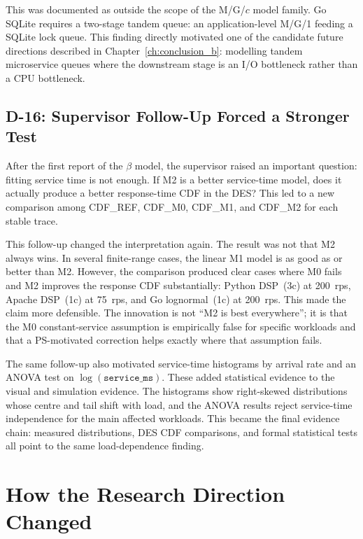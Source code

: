 This was documented as outside the scope of the M/G/$c$ model family. Go SQLite requires a two-stage tandem queue: an application-level M/G/1 feeding a SQLite lock queue. This finding directly motivated one of the candidate future directions described in Chapter~\ref{ch:conclusion_b}: modelling tandem microservice queues where the downstream stage is an I/O bottleneck rather than a CPU bottleneck.

\subsection{D-16: Supervisor Follow-Up Forced a Stronger Test}

After the first report of the $\beta$ model, the supervisor raised an important question: fitting service time is not enough. If M2 is a better service-time model, does it actually produce a better response-time CDF in the DES? This led to a new comparison among CDF\_REF, CDF\_M0, CDF\_M1, and CDF\_M2 for each stable trace.

This follow-up changed the interpretation again. The result was not that M2 always wins. In several finite-range cases, the linear M1 model is as good as or better than M2. However, the comparison produced clear cases where M0 fails and M2 improves the response CDF substantially: Python DSP~(3c) at 200~rps, Apache DSP~(1c) at 75~rps, and Go lognormal~(1c) at 200~rps. This made the claim more defensible. The innovation is not ``M2 is best everywhere''; it is that the M0 constant-service assumption is empirically false for specific workloads and that a PS-motivated correction helps exactly where that assumption fails.

The same follow-up also motivated service-time histograms by arrival rate and an ANOVA test on $\log(\texttt{service\_ms})$. These added statistical evidence to the visual and simulation evidence. The histograms show right-skewed distributions whose centre and tail shift with load, and the ANOVA results reject service-time independence for the main affected workloads. This became the final evidence chain: measured distributions, DES CDF comparisons, and formal statistical tests all point to the same load-dependence finding.

\section{How the Research Direction Changed}
\label{sec:journey-pivot}

